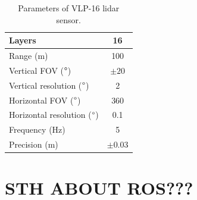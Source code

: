 \begin{table}[H]
\centering
\begin{tabular}{|l|c|}
\hline
Layers                            & 16   \\ \hline
Range (m)                         & 100  \\ \hline
Vertical FOV ($\degree$)          & $\pm20$   \\ \hline
Vertical resolution ($\degree$)   & 2    \\ \hline
Horizontal FOV ($\degree$)        & 360  \\ \hline
Horizontal resolution ($\degree$) & 0.1  \\ \hline
Frequency (Hz)                    & 5    \\ \hline
Precision (m)                     & $\pm0.03$ \\ \hline
\end{tabular}
\caption{Parameters of VLP-16 lidar sensor.}
\label{tab:lidar}
\end{table}


\section{STH ABOUT ROS???}